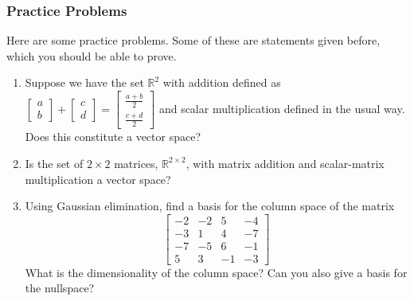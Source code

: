 \documentclass[10pt]{beamer}
\begin{document}
\begin{frame}
  \frametitle{Practice Problems}
  Here are some practice problems. Some of these are statements given before, which you should be able to prove.
  \begin{enumerate}
  \item Suppose we have the set $\mathbb{R}^2$ with addition defined as $\left[\begin{matrix}
      a\\
      b
    \end{matrix}\right] + \left[\begin{matrix}
      c\\
      d
    \end{matrix}\right] = \left[\begin{matrix}
      \frac{a + b}{2}\\
      \frac{c + d}{2}
    \end{matrix}\right]$ and scalar multiplication defined in the usual way. Does this constitute a vector space?
  \item Is the set of $2\times 2$ matrices, $\mathbb{R}^{2\times 2}$, with matrix addition and scalar-matrix multiplication a vector space?
  \item Using Gaussian elimination, find a basis for the column space of the matrix
    $$\left[\begin{matrix}
      -2 & -2 & 5 & -4\\
      -3 & 1 & 4 & -7\\
      -7 & -5 & 6 & -1\\
      5 & 3 & -1 & -3
    \end{matrix}\right]$$
    What is the dimensionality of the column space? Can you also give a basis for the nullspace?
  \end{enumerate}
\end{frame}
\end{document}
